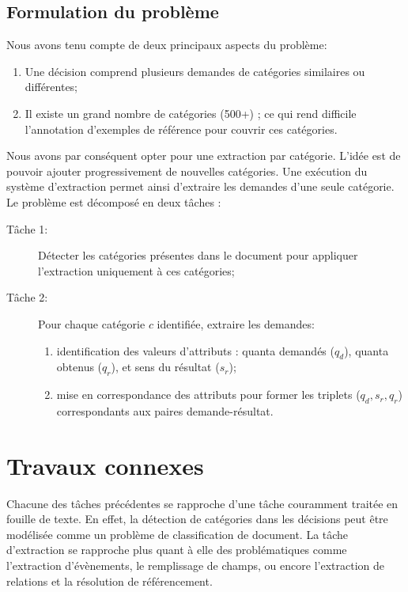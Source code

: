 

\subsection{Formulation du problème}
\label{sec:quanta:formulation}

Nous avons tenu compte de deux principaux aspects du problème:
\begin{enumerate}
	\item Une décision comprend plusieurs demandes de catégories similaires ou différentes;
	\item  Il existe un grand nombre de catégories (500+) ; ce qui rend difficile l'annotation d'exemples de référence pour couvrir ces catégories.
\end{enumerate}

Nous avons par conséquent opter pour une extraction par catégorie. L'idée est de pouvoir ajouter progressivement de nouvelles catégories. Une exécution du système d'extraction permet ainsi d'extraire les demandes d'une seule catégorie. Le problème est décomposé en deux tâches :
\begin{description}
	\item[Tâche 1:] Détecter les catégories présentes dans le document pour appliquer l'extraction  uniquement à ces catégories;
	\item[Tâche 2:] Pour chaque catégorie $c$ identifiée, extraire les demandes:
	\begin{enumerate}
		\item identification des valeurs d'attributs : quanta demandés ($q_d$), quanta obtenus ($q_r$), et sens du résultat ($s_r$);
		\item mise en correspondance des attributs pour former les triplets ($q_d, s_r, q_r$) correspondants aux paires demande-résultat.
	\end{enumerate}
\end{description}

 
\section{Travaux connexes}
\label{sec:quanta:biblio}
Chacune des tâches précédentes se rapproche d'une tâche couramment traitée en fouille de texte. En effet, la détection de catégories dans les décisions peut être modélisée comme un problème de classification de document. La tâche d'extraction se rapproche plus quant à elle des problématiques comme l'extraction d'évènements, le remplissage de champs, ou encore l'extraction de relations et la résolution de référencement.


